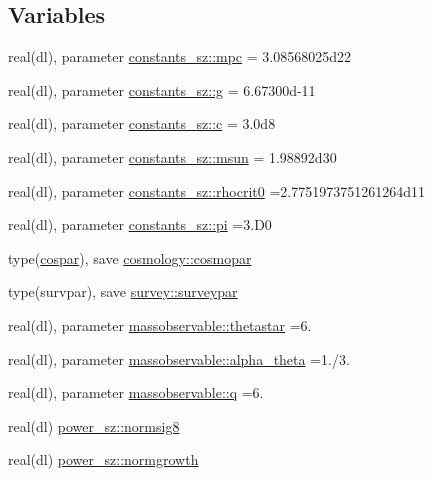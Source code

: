 \subsection*{Variables}
\begin{DoxyCompactItemize}
\item 
real(dl), parameter \mbox{\hyperlink{namespaceconstants__sz_a961cb32bc8976382938d3a7904a98a59}{constants\+\_\+sz\+::mpc}} = 3.\+08568025d22
\item 
real(dl), parameter \mbox{\hyperlink{namespaceconstants__sz_afc00b3b7788a7e78be7091be3734f664}{constants\+\_\+sz\+::g}} = 6.\+67300d-\/11
\item 
real(dl), parameter \mbox{\hyperlink{namespaceconstants__sz_adeada82443a5e762195aacb1be5b134b}{constants\+\_\+sz\+::c}} = 3.\+0d8
\item 
real(dl), parameter \mbox{\hyperlink{namespaceconstants__sz_a1722de599fff703c9c4ed22a8944cde8}{constants\+\_\+sz\+::msun}} = 1.\+98892d30
\item 
real(dl), parameter \mbox{\hyperlink{namespaceconstants__sz_a7428cc3cfaacdf588f533cb06a70822d}{constants\+\_\+sz\+::rhocrit0}} =2.\+7751973751261264d11
\item 
real(dl), parameter \mbox{\hyperlink{namespaceconstants__sz_a60522a8c991ef19549e52f3e2818a7b9}{constants\+\_\+sz\+::pi}} =3.\+D0
\item 
type(\mbox{\hyperlink{structcosmology_1_1cospar}{cospar}}), save \mbox{\hyperlink{namespacecosmology_a58e3904346959bd5f3207f5f1f327e0e}{cosmology\+::cosmopar}}
\item 
type(survpar), save \mbox{\hyperlink{namespacesurvey_a4fc1eec30a42a46b8a0ea67ca671fc83}{survey\+::surveypar}}
\item 
real(dl), parameter \mbox{\hyperlink{namespacemassobservable_ad190951c647b00dc7f3cd907426e73df}{massobservable\+::thetastar}} =6.
\item 
real(dl), parameter \mbox{\hyperlink{namespacemassobservable_a5a2fa41bd7c65ad6bcb80c5a33cb9b2a}{massobservable\+::alpha\+\_\+theta}} =1./3.
\item 
real(dl), parameter \mbox{\hyperlink{namespacemassobservable_adc6186979c0880b189270b9d6fa1f933}{massobservable\+::q}} =6.
\item 
real(dl) \mbox{\hyperlink{namespacepower__sz_a9c2a55f8b77bacfff31fc7792410a4cc}{power\+\_\+sz\+::normsig8}}
\item 
real(dl) \mbox{\hyperlink{namespacepower__sz_ad00d03b01e9af9747a7013d7ea680a25}{power\+\_\+sz\+::normgrowth}}
\item 

\end{DoxyCompactItemize}
